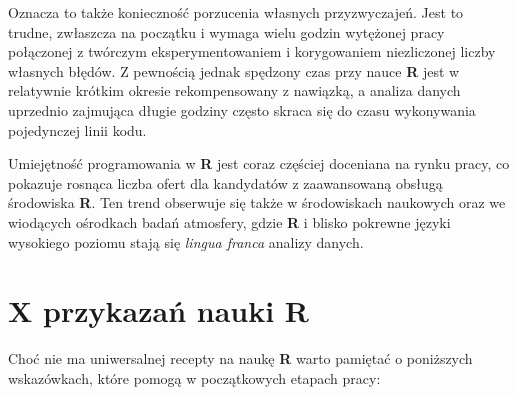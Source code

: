 \documentclass[]{book}
\theoremstyle{definition}
\theoremstyle{definition}
\theoremstyle{definition}
\theoremstyle{remark}
\begin{document}
Oznacza to także konieczność porzucenia własnych przyzwyczajeń. Jest to
trudne, zwłaszcza na początku i wymaga wielu godzin wytężonej pracy
połączonej z twórczym eksperymentowaniem i korygowaniem niezliczonej
liczby własnych błędów. Z pewnością jednak spędzony czas przy nauce
\textbf{R} jest w relatywnie krótkim okresie rekompensowany z nawiązką,
a analiza danych uprzednio zajmująca długie godziny często skraca się do
czasu wykonywania pojedynczej linii kodu.

Umiejętność programowania w \textbf{R} jest coraz częściej doceniana na
rynku pracy, co pokazuje rosnąca liczba ofert dla kandydatów z
zaawansowaną obsługą środowiska \textbf{R}. Ten trend obserwuje się
także w środowiskach naukowych oraz we wiodących ośrodkach badań
atmosfery, gdzie \textbf{R} i blisko pokrewne języki wysokiego poziomu
stają się \emph{lingua franca} analizy danych.

\section{\texorpdfstring{X przykazań nauki
\textbf{R}}{X przykazań nauki R}}\label{x-przykazan-nauki-r}

Choć nie ma uniwersalnej recepty na naukę \textbf{R} warto pamiętać o
poniższych wskazówkach, które pomogą w początkowych etapach pracy:
\end{document}
